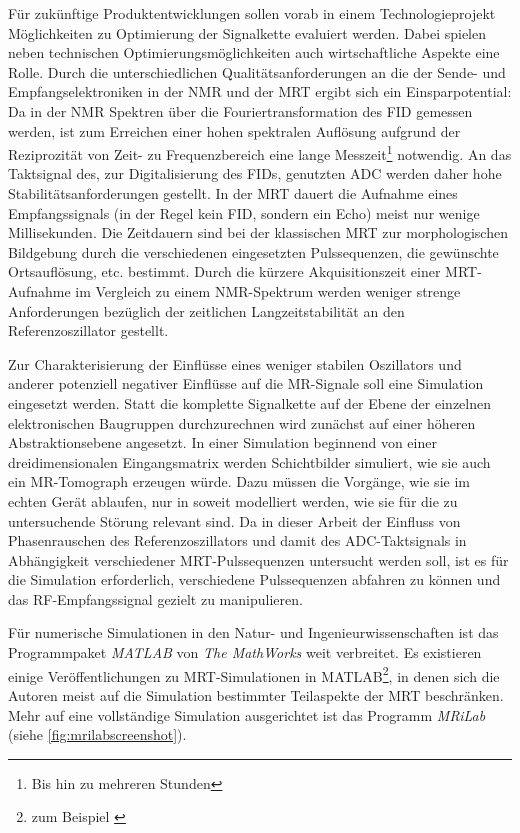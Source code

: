 Für zukünftige Produktentwicklungen sollen vorab in einem Technologieprojekt Möglichkeiten zu Optimierung der Signalkette evaluiert werden. Dabei spielen neben technischen Optimierungsmöglichkeiten auch wirtschaftliche Aspekte eine Rolle.
Durch die unterschiedlichen Qualitätsanforderungen an die der Sende- und Empfangselektroniken in der NMR und der MRT ergibt sich ein Einsparpotential: Da in der NMR Spektren über die Fouriertransformation des FID gemessen werden, ist zum Erreichen einer hohen spektralen Auflösung aufgrund der Reziprozität von Zeit- zu Frequenzbereich eine lange Messzeit\footnote{Bis hin zu mehreren Stunden} notwendig. An das Taktsignal des, zur Digitalisierung des FIDs, genutzten ADC werden daher hohe Stabilitätsanforderungen gestellt. In der MRT dauert die Aufnahme eines Empfangssignals (in der Regel kein FID, sondern ein Echo) meist nur wenige Millisekunden. Die Zeitdauern sind bei der klassischen MRT zur morphologischen Bildgebung durch die verschiedenen eingesetzten Pulssequenzen, die gewünschte Ortsauflösung, etc. bestimmt.
Durch die kürzere Akquisitionszeit einer MRT-Aufnahme im Vergleich zu einem NMR-Spektrum werden weniger strenge Anforderungen bezüglich der zeitlichen Langzeitstabilität an den Referenzoszillator gestellt.

Zur Charakterisierung der Einflüsse eines weniger stabilen Oszillators und anderer potenziell negativer Einflüsse auf die MR-Signale soll eine Simulation eingesetzt werden. Statt die komplette Signalkette auf der Ebene der einzelnen elektronischen Baugruppen durchzurechnen wird zunächst auf einer höheren Abstraktionsebene angesetzt. In einer Simulation beginnend von einer dreidimensionalen Eingangsmatrix werden Schichtbilder simuliert, wie sie auch ein MR-Tomograph erzeugen würde. Dazu müssen die Vorgänge, wie sie im echten Gerät ablaufen, nur in soweit modelliert werden, wie sie für die zu untersuchende Störung relevant sind. Da in dieser Arbeit der Einfluss von Phasenrauschen des Referenzoszillators und damit des ADC-Taktsignals in Abhängigkeit verschiedener MRT-Pulssequenzen untersucht werden soll, ist es für die Simulation erforderlich, verschiedene Pulssequenzen abfahren zu können und das RF-Empfangssignal gezielt zu manipulieren.

Für numerische Simulationen in den Natur- und Ingenieurwissenschaften ist das Programmpaket \textit{MATLAB}\cite{matlab} von \textit{The MathWorks} weit verbreitet. Es existieren einige Ver\-öffent\-lichungen zu MRT-Simulationen in MATLAB\footnote{zum Beispiel \cite{Kern2012}}, in denen sich die Autoren meist auf die Simulation bestimmter Teilaspekte der MRT beschränken. Mehr auf eine vollständige Simulation ausgerichtet ist das Programm \textit{MRiLab}\cite{Liu2017} (siehe \autoref{fig:mrilabscreenshot}).

